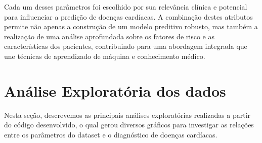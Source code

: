 \documentclass[conference]{IEEEtran}
\begin{document}
Cada um desses parâmetros foi escolhido por sua relevância clínica e potencial para influenciar a predição de doenças cardíacas. A combinação destes atributos permite não apenas a construção de um modelo preditivo robusto, mas também a realização de uma análise aprofundada sobre os fatores de risco e as características dos pacientes, contribuindo para uma abordagem integrada que une técnicas de aprendizado de máquina e conhecimento médico.

\section{Análise Exploratória dos dados}
Nesta seção, descrevemos as principais análises exploratórias realizadas a partir do código desenvolvido, o qual gerou diversos gráficos para investigar as relações entre os parâmetros do dataset e o diagnóstico de doenças cardíacas.
\end{document}
